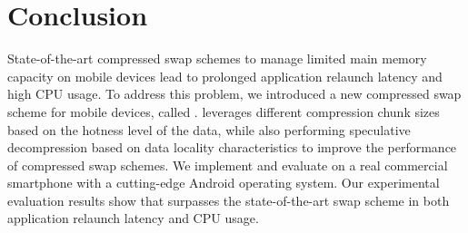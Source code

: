 \section{Conclusion}
State-of-the-art compressed swap schemes to manage limited main memory capacity on mobile devices lead to prolonged application relaunch latency and high CPU usage. To address this problem, we introduced a new compressed swap scheme for mobile devices, called \proposal.
\proposal leverages different compression chunk sizes based on the hotness level of the data, while also performing speculative decompression based on data locality characteristics to improve the performance of compressed swap schemes.
We implement and evaluate \proposal on a real commercial smartphone with a cutting-edge Android operating system. Our experimental evaluation results show that \proposal surpasses the state-of-the-art swap scheme in both application relaunch latency and CPU usage.







